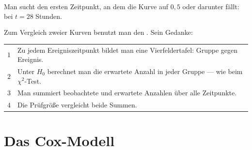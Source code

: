 \begin{merksatz}
Man sucht den ersten Zeitpunkt, an dem die Kurve auf $0{,}5$ oder darunter fällt: bei $t = 28$ Stunden.

\begin{center}
\begin{minipage}{0.88\textwidth}
\end{minipage}
\end{center}
\end{merksatz}

\begin{merksatz}
Zum Vergleich zweier Kurven benutzt man den . Sein Gedanke:

\begin{center}
\renewcommand{\arraystretch}{1.5}
\begin{tabular}{@{}P{1.0cm}P{7.4cm}@{}}
\toprule
$1$ & Zu jedem Ereigniszeitpunkt bildet man eine Vierfeldertafel: Gruppe gegen Ereignis.\\
$2$ & Unter $H_0$ berechnet man die erwartete Anzahl in jeder Gruppe --- wie beim $\chi^2$-Test.\\
$3$ & Man summiert beobachtete und erwartete Anzahlen über alle Zeitpunkte.\\
$4$ & Die Prüfgröße vergleicht beide Summen.\\
\bottomrule
\end{tabular}
\end{center}

\begin{center}
\begin{minipage}{0.88\textwidth}
\end{minipage}
\end{center}
\end{merksatz}

\section{Das Cox-Modell}

